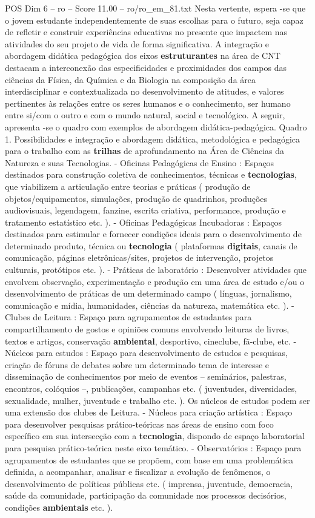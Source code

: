 \begin{textsample}{POS Dim 6 – ro – Score 11.00 – ro/ro\_em\_81.txt}
Nesta vertente, espera -se que o jovem estudante independentemente de suas escolhas para o futuro, seja capaz de refletir e construir experiências educativas no presente que impactem nas atividades do seu projeto de vida de forma significativa.
A integração e abordagem didática pedagógica dos eixos \textbf{estruturantes} na área de CNT destacam a interconexão das especificidades e proximidades dos campos das ciências da Física, da Química e da Biologia na composição da área interdisciplinar e contextualizada no desenvolvimento de atitudes, e valores pertinentes às relações entre os seres humanos e o conhecimento, ser humano entre si/com o outro e com o mundo natural, social e tecnológico.
A seguir, apresenta -se o quadro com exemplos de abordagem didática-pedagógica.
Quadro 1.
Possibilidades e integração e abordagem didática, metodológica e pedagógica para o trabalho com as \textbf{trilhas} de aprofundamento na Área de Ciências da Natureza e suas Tecnologias. - Oficinas Pedagógicas de Ensino : Espaços destinados para construção coletiva de conhecimentos, técnicas e \textbf{tecnologias}, que viabilizem a articulação entre teorias e práticas ( produção de objetos/equipamentos, simulações, produção de quadrinhos, produções audiovisuais, legendagem, fanzine, escrita criativa, performance, produção e tratamento estatístico etc. ). - Oficinas Pedagógicas Incubadoras : Espaços destinados para estimular e fornecer condições ideais para o desenvolvimento de determinado produto, técnica ou \textbf{tecnologia} ( plataformas \textbf{digitais}, canais de comunicação, páginas eletrônicas/sites, projetos de intervenção, projetos culturais, protótipos etc. ). - Práticas de laboratório : Desenvolver atividades que envolvem observação, experimentação e produção em uma área de estudo e/ou o desenvolvimento de práticas de um determinado campo ( línguas, jornalismo, comunicação e mídia, humanidades, ciências da natureza, matemática etc. ). - Clubes de Leitura : Espaço para agrupamentos de estudantes para compartilhamento de gostos e opiniões comuns envolvendo leituras de livros, textos e artigos, conservação \textbf{ambiental}, desportivo, cineclube, fã-clube, etc. - Núcleos para estudos : Espaço para desenvolvimento de estudos e pesquisas, criação de fóruns de debates sobre um determinado tema de interesse e disseminação de conhecimentos por meio de eventos – seminários, palestras, encontros, colóquios –, publicações, campanhas etc. ( juventudes, diversidades, sexualidade, mulher, juventude e trabalho etc. ).
Os núcleos de estudos podem ser uma extensão dos clubes de Leitura. - Núcleos para criação artística : Espaço para desenvolver pesquisas prático-teóricas nas áreas de ensino com foco específico em sua intersecção com a \textbf{tecnologia}, dispondo de espaço laboratorial para pesquisa prático-teórica neste eixo temático. - Observatórios : Espaço para agrupamentos de estudantes que se propõem, com base em uma problemática definida, a acompanhar, analisar e fiscalizar a evolução de fenômenos, o desenvolvimento de políticas públicas etc. ( imprensa, juventude, democracia, saúde da comunidade, participação da comunidade nos processos decisórios, condições \textbf{ambientais} etc. ).

\end{textsample}

